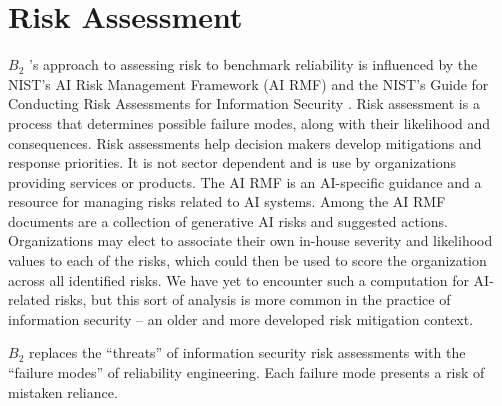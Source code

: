 \documentclass{article}
\newcommand\bb{$B_2$ }
\begin{document}
\section{Risk Assessment}
\bb's approach to assessing risk to benchmark reliability is influenced by the NIST's AI Risk Management Framework (AI RMF) \cite{nistAI_RMF} and the NIST's Guide for Conducting Risk Assessments for Information Security \cite{nist80030r1}. Risk assessment is a process that determines possible failure modes, along with their likelihood and consequences\cite{rausand2020risk}. Risk assessments help decision makers develop mitigations and response priorities. It is not sector dependent and is use by organizations providing services or products.  The AI RMF is an AI-specific guidance and a resource for managing risks related to AI systems. Among the AI RMF documents are a collection of generative AI risks and suggested actions. Organizations may elect to associate their own in-house severity and likelihood values to each of the risks, which could then be used to score the organization across all identified risks. We have yet to encounter such a computation for AI-related risks, but this sort of analysis is more common in the practice of information security -- an older and more developed risk mitigation context.

\bb replaces the ``threats'' of information security risk assessments with the ``failure modes'' of reliability engineering. Each failure mode presents a risk of mistaken reliance.

\end{document}
